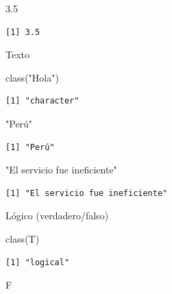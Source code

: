 \documentclass[
  letterpaper,
  DIV=11,
  numbers=noendperiod,
  twoside]{scrreprt}
\newenvironment{Shaded}{\begin{snugshade}}{\end{snugshade}}
\newcommand{\FloatTok}[1]{\textcolor[rgb]{0.68,0.00,0.00}{#1}}
\newcommand{\FunctionTok}[1]{\textcolor[rgb]{0.28,0.35,0.67}{#1}}
\newcommand{\NormalTok}[1]{\textcolor[rgb]{0.00,0.23,0.31}{#1}}
\newcommand{\StringTok}[1]{\textcolor[rgb]{0.13,0.47,0.30}{#1}}
\begin{document}
\begin{Shaded}
\begin{Highlighting}[]
\FloatTok{3.5}
\end{Highlighting}
\end{Shaded}

\begin{verbatim}
[1] 3.5
\end{verbatim}

Texto

\begin{Shaded}
\begin{Highlighting}[]
\FunctionTok{class}\NormalTok{(}\StringTok{"Hola"}\NormalTok{)}
\end{Highlighting}
\end{Shaded}

\begin{verbatim}
[1] "character"
\end{verbatim}

\begin{Shaded}
\begin{Highlighting}[]
\StringTok{"Perú"}
\end{Highlighting}
\end{Shaded}

\begin{verbatim}
[1] "Perú"
\end{verbatim}

\begin{Shaded}
\begin{Highlighting}[]
\StringTok{"El servicio fue ineficiente"}
\end{Highlighting}
\end{Shaded}

\begin{verbatim}
[1] "El servicio fue ineficiente"
\end{verbatim}

Lógico (verdadero/falso)

\begin{Shaded}
\begin{Highlighting}[]
\FunctionTok{class}\NormalTok{(T)}
\end{Highlighting}
\end{Shaded}

\begin{verbatim}
[1] "logical"
\end{verbatim}

\begin{Shaded}
\begin{Highlighting}[]
\NormalTok{F}
\end{Highlighting}
\end{Shaded}
\end{document}
